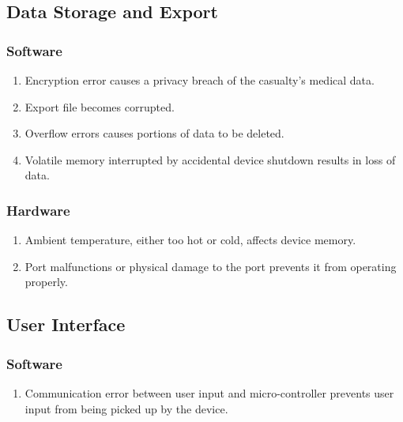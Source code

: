 \documentclass{article}
\begin{document}
    \subsection{Data Storage and Export}

        \subsubsection{Software}
            \begin{enumerate}[label = (\alph*)]
                \item Encryption error causes a privacy breach of the casualty's medical data.
                \item Export file becomes corrupted.
                \item Overflow errors causes portions of data to be deleted.
                \item Volatile memory interrupted by accidental device shutdown results in loss of data.
            \end{enumerate}
        \subsubsection{Hardware}
            \begin{enumerate}[label = (\alph*)]
                \item Ambient temperature, either too hot or cold, affects device memory.
                \item Port malfunctions or physical damage to the port prevents it from operating properly.
            \end{enumerate}
    
    \subsection{User Interface}
        \subsubsection{Software}
            \begin{enumerate}[label = (\alph*)]
                \item Communication error between user input and micro-controller prevents user input from being picked up by the device. 
            \end{enumerate}
\end{document}
